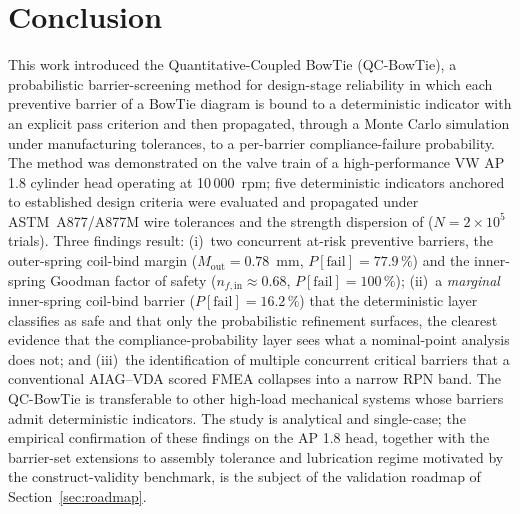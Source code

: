 
\section{Conclusion}\label{sec:conclusion}

This work introduced the Quantitative-Coupled BowTie (QC-BowTie), a
probabilistic barrier-screening method for design-stage reliability in
which each preventive barrier of a BowTie diagram is bound to a
deterministic indicator with an explicit pass criterion and then
propagated, through a Monte Carlo simulation under manufacturing
tolerances, to a per-barrier compliance-failure probability. The method
was demonstrated on the valve train of a high-performance VW AP 1.8
cylinder head operating at 10\,000~rpm; five deterministic indicators
anchored to established design criteria were evaluated and propagated
under ASTM~A877/A877M wire tolerances and the strength dispersion of
\citet[\S~10-30]{shigley2020} ($N=2\times 10^{5}$ trials). Three
findings result: (i)~two concurrent at-risk preventive barriers, the outer-spring coil-bind margin ($M_{\mathrm{out}}=0.78$~mm,
$P[\mathrm{fail}]=77.9\,\%$) and the inner-spring Goodman factor of
safety ($n_{f,\mathrm{in}}\approx 0.68$, $P[\mathrm{fail}]=100\,\%$);
(ii)~a \emph{marginal} inner-spring coil-bind barrier
($P[\mathrm{fail}]=16.2\,\%$) that the deterministic layer classifies as
safe and that only the probabilistic refinement surfaces, the
clearest evidence that the compliance-probability layer sees what a
nominal-point analysis does not; and (iii)~the identification of
multiple concurrent critical barriers that a conventional AIAG--VDA
scored FMEA collapses into a narrow RPN band. The QC-BowTie is
transferable to other high-load mechanical systems whose barriers admit
deterministic indicators. The study is analytical and single-case; the
empirical confirmation of these findings on the AP 1.8 head, together
with the barrier-set extensions to assembly tolerance and lubrication
regime motivated by the construct-validity benchmark, is the subject of
the validation roadmap of Section~\ref{sec:roadmap}.
